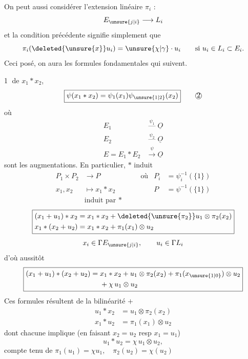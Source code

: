 On peut aussi considérer l'extension linéaire  $\pi_i$ :
\[
E_{\unsure{j|i}}\longrightarrow L_i
\]
et la condition précédente signifie simplement que
\[
\pi_i(\deleted{\unsure{x}}u_i)=\unsure{\chi|\gamma}\cdot u_i\qquad\text{si }u_i\in L_i\subset E_i.
\]
Ceci posé, on aura les formules fondamentales qui suivent.

\textcircled{1}  de $x_1*x_2$,
\[
\boxed{\psi(x_1*x_2)=\psi_1(x_1)\psi_{\unsure{1|2}}(x_2)}\tag*{\textcircled{2}}
\]
où
\[
\begin{aligned}
E_1&\overset{\psi_1}{\mathrel{\text{---}}}\underline O\\
E_2&\overset{\psi_2}{\mathrel{\text{---}}}\underline O\\
E=E_1*E_2&\xrightarrow{\psi}\underline O
\end{aligned}
\]
sont les augmentations. En particulier, $*$ induit
\[
\begin{aligned}
P_1\times P_2&\longrightarrow P&\quad&\text{où}&P_i&=\psi_i^{-1}(\{1\})\\
x_1,x_2&\longmapsto x_1*x_2&&&P&=\psi^{-1}(\{1\})\\[-2pt]
&\text{induit par }*
\end{aligned}
\]
\[
\boxed{\begin{aligned}
(x_1+u_1)*x_2&=x_1*x_2+\deleted{\unsure{\pi_2}}u_1\otimes\pi_2(x_2)\\
x_1*(x_2+u_2)&=x_1*x_2+\pi_1(x_1)\otimes u_2
\end{aligned}}
\]
\[
x_i\in\Gamma E_{\unsure{j|i}},\qquad u_i\in\Gamma L_i
\]
d'où aussitôt
\[
\boxed{\begin{aligned}
(x_1+u_1)*(x_2+u_2)={}&x_1*x_2+u_1\otimes\pi_2(x_2)+\pi_1(x_{\unsure{1|0}})\otimes u_2\\
&+\chi\,u_1\otimes u_2
\end{aligned}}
\]
Ces formules résultent de la bilinéarité $+$
\[
\boxed{\begin{aligned}
u_1*x_2&=u_1\otimes\pi_2(x_2)\\
x_1*u_2&=\pi_1(x_1)\otimes u_2
\end{aligned}}
\]
 dont chacune implique (en faisant $x_2=u_2$ resp $x_1=u_1$)
\[
\boxed{u_1*u_2=\chi\,u_1\otimes u_2},
\]
compte tenu de $\pi_1(u_1)=\chi u_1,\quad\pi_2(u_2)=\chi(u_2)$
